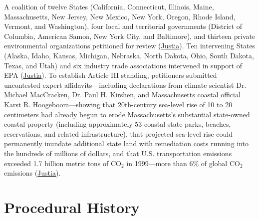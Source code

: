 \documentclass[12pt]{article}
\begin{document}
A coalition of twelve States (California, Connecticut, Illinois, Maine, Massachusetts, New Jersey, New Mexico, New York, Oregon, Rhode Island, Vermont, and Washington), four local and territorial governments (District of Columbia, American Samoa, New York City, and Baltimore), and thirteen private environmental organizations petitioned for review (\href{https://supreme.justia.com/cases/federal/us/549/497/}{Justia}). Ten intervening States (Alaska, Idaho, Kansas, Michigan, Nebraska, North Dakota, Ohio, South Dakota, Texas, and Utah) and six industry trade associations intervened in support of EPA (\href{https://supreme.justia.com/cases/federal/us/549/497/}{Justia}). To establish Article III standing, petitioners submitted uncontested expert affidavits---including declarations from climate scientist Dr. Michael MacCracken, Dr. Paul H. Kirshen, and Massachusetts coastal official Karst R. Hoogeboom---showing that 20th-century sea-level rise of 10 to 20 centimeters had already begun to erode Massachusetts's substantial state-owned coastal property (including approximately 53 coastal state parks, beaches, reservations, and related infrastructure), that projected sea-level rise could permanently inundate additional state land with remediation costs running into the hundreds of millions of dollars, and that U.S. transportation emissions exceeded 1.7 billion metric tons of $\mathrm{CO_2}$ in 1999---more than 6\% of global $\mathrm{CO_2}$ emissions (\href{https://supreme.justia.com/cases/federal/us/549/497/}{Justia}).

\section{Procedural History}
\end{document}
